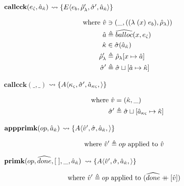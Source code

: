 \documentclass[12pt,draft]{article}
\newcommand\mdoubleplus{\ensuremath{\mathbin{+\mkern-9mu+}}}
\newcommand{\singlelamsyn}[2]{(\lambda\;(#1)\;#2)}
\newcommand{\E}[4]{E\langle #1 , #2 , #3 , #4 \rangle}
\newcommand{\A}[4]{A\langle #1 , #2 , #3 , #4 \rangle}
\begin{document}
\begin{multicols*}{2}
\vfill\null
\columnbreak


\begin{center}
  $\textbf{callcck}(e_{\hat{\varsigma}} , \hat{a}_{\hat{\kappa}})$
  $\leadsto \{\E{e_b}{\aenv_{\lambda}'}{\astore'}{\akaddr}\}$
\end{center}
\vspace{-7mm}
\begin{align*}
  \text{where }
  \aval &\ni (\_ , (\singlelamsyn{x}{e_b} , \aenv_{\lambda})) \\
  \abaddr &\triangleq \aballoc{x , \ectrl} \\
  \akont &\in \astore(\akaddr) \\
  \aenv_{\lambda}' &\triangleq \aenv_{\lambda}[x \mapsto \abaddr] \\
  \astore' &\triangleq \astore \sqcup [\abaddr \mapsto \akont]
\end{align*}
\begin{center}
  $\textbf{callcck}(\_, \_)$
  $\leadsto \{\A{\actrlkont}{\astore'}{\actrladdr}{}\}$
\end{center}
\vspace{-7mm}
\begin{align*}
  \text{where }
  \hat{v} &= (\hat{\kappa} , \_) \\
  \hat{\sigma}' &\triangleq \hat{\sigma} \sqcup [\hat{a}_{\kappa\varsigma} \mapsto \hat{\kappa}]
\end{align*}
\begin{center}
  $\textbf{appprimk}(op, \hat{a}_{\hat{\kappa}})$
  $\leadsto \{\A{\aval'}{\astore}{\akaddr}{}\}$
\end{center}
\vspace{-7mm}
\begin{align*}
  \text{where } \hat{v}' &\triangleq op \text{ applied to } \hat{v}
\end{align*}
\begin{center}
  $\textbf{primk}(op, \widehat{done}, [\;], \_, \hat{a}_{\hat{\kappa}})$
  $\leadsto \{\A{\aval'}{\astore}{\akaddr}{}\}$
\end{center}
\vspace{-7mm}
\begin{align*}
  \text{where }\aval'&\triangleq op\text{ applied to }(\adone \mdoubleplus [\aval])

\end{align*}
\end{multicols*}
\end{document}
